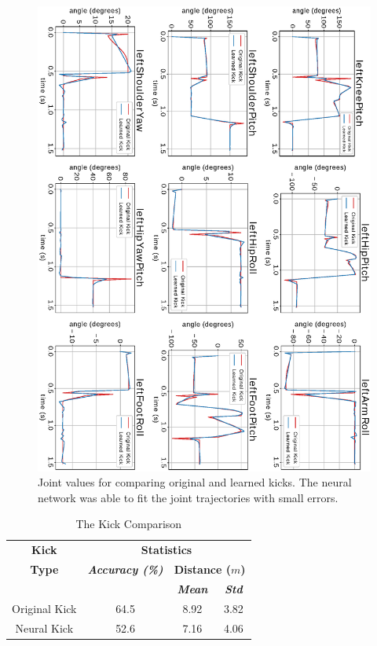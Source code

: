 \begin{figure}[!htbp]
	\centering
	\includegraphics[angle=90,width=1\textwidth]{Cap6/kick_joints_curve}
	\caption{Joint values for comparing original and learned kicks. The neural network was able to fit the joint trajectories with small errors.}
	\label{fig:kick_joints_curves}
\end{figure}


\begin{table}[htbp]
	\caption{The Kick Comparison}
	\begin{center} 
		\begin{tabular}{|c|c|c|c|}
			\hline
			\textbf{Kick}&\multicolumn{3}{|c|}{\textbf{Statistics}} \\
			\cline{2-4} 
			\textbf{Type} & \textbf{\textit{Accuracy (\%)}}& \multicolumn{2}{|c|}{\textbf{Distance (\(m\))}} \\ 
			\cline {3-4}
			& & \textbf{\textit{Mean}}& \textbf{\textit{Std}} \\
			\hline
			Original Kick & 64.5 & 8.92 & 3.82  \\
			\hline
			Neural Kick & 52.6 & 7.16 & 4.06 \\
			\hline
		\end{tabular}
		\label{tab_kicks_statistics}
	\end{center}
\end{table}

